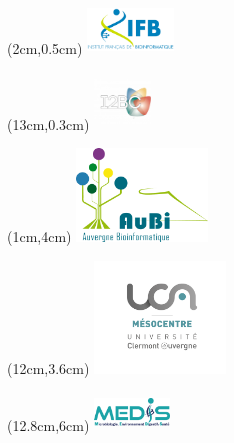 
\begin{frame}
  \titlepage
  \begin{textblock*}{5cm}(2cm,0.5cm) %
  \includegraphics[width=2.3cm,height=1.3cm]{images/logo_ifb.pdf}
  \end{textblock*}
  \begin{textblock*}{5cm}(13cm,0.3cm) %
  \includegraphics[width=1.5cm,height=1.5cm]{images/i2bc.png}
  \end{textblock*}
  \begin{textblock*}{5cm}(1cm,4cm) %
  \includegraphics[width=3.5cm,height=2.5cm]{images/logoAuBi-2019.pdf}
  \end{textblock*}
  \begin{textblock*}{5cm}(12cm,3.6cm) %
  \includegraphics[width=3.5cm,height=3cm]{images/mesocentre.png}
  \end{textblock*}
   \begin{textblock*}{5cm}(12.8cm,6cm) %
  \includegraphics[width=2cm,height=1cm]{images/medis_logo.png}
  \end{textblock*}
\end{frame}

